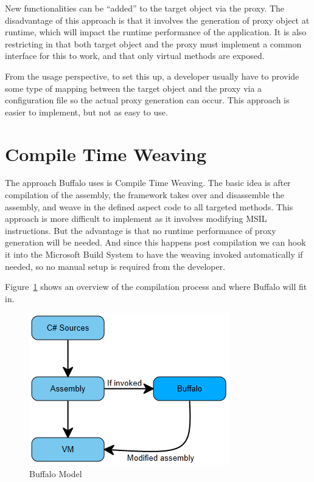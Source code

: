 New functionalities can be “added” to the target object via the proxy. The disadvantage of this approach is that it involves the generation of proxy object at runtime, which will impact the runtime performance of the application. It is also restricting in that both target object and the proxy must implement a common interface for this to work, and that only virtual methods are exposed.

From the usage perspective, to set this up, a developer usually have to provide some type of mapping between the target object and the proxy via a configuration file so the actual proxy generation can occur. This approach is easier to implement, but not as easy to use.

\section{Compile Time Weaving}

The approach Buffalo uses is Compile Time Weaving. The basic idea is after compilation of the assembly, the framework takes over and disassemble the assembly, and weave in the defined aspect code to all targeted methods. This approach is more difficult to implement as it involves modifying MSIL instructions. But the advantage is that no runtime performance of proxy generation will be needed. And since this happens post compilation we can hook it into the Microsoft Build System to have the weaving invoked automatically if needed, so no manual setup is required from the developer.

Figure~\ref{buffalo_model} shows an overview of the compilation process and where Buffalo will fit in.

\begin{figure}[H]
  \includegraphics[scale=1.0]{BuffaloOverview.PNG}
  \centering
  \caption{Buffalo Model\label{buffalo_model}}
\end{figure}

